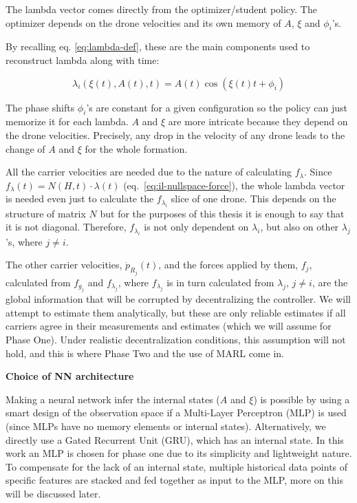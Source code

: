 The lambda vector comes directly from the optimizer/student policy. The
optimizer depends on the drone velocities and its own memory of $A$,
$\xi$ and $\phi_i$'s.

By recalling eq. \eqref{eq:lambda-def}, these are the main components
used to reconstruct lambda along with time:

\begin{equation}
  \lambda_i(\xi(t), A(t), t) = A(t) \cos(\xi(t) t + \phi_i)
  \label{eq:lambda-def-recap}
\end{equation}

The phase shifts $\phi_i$'s are constant for a given configuration so
the policy can just memorize it for each lambda. $A$ and $\xi$ are more
intricate because they depend on the drone velocities. Precisely, any
drop in the velocity of any drone leads to the change of $A$ and $\xi$
for the whole formation.

All the carrier velocities are needed due to the nature of calculating
$f_\lambda$. Since $f_\lambda(t) = N(H,t) \cdot \lambda(t)$
(eq.~\eqref{eq:il-nullspace-force}), the whole lambda vector is needed
even just to calculate the $f_{\lambda_i}$ slice of one drone. This
depends on the structure of matrix $N$ but for the purposes of this
thesis it is enough to say that it is not diagonal. Therefore,
$f_{\lambda_i}$ is not only dependent on $\lambda_i$, but also on
other $\lambda_j$'s, where $j \neq i$.

The other carrier velocities, $\dot{p}_{R_j}(t)$, and the
forces applied by them, $f_j$, calculated from $f_{g_j}$ and
$f_{\lambda_j}$, where $f_{\lambda_j}$ is in turn calculated from
$\lambda_j$, $j \neq i$, are the global information that will be
corrupted by decentralizing the controller. We will attempt to estimate
them analytically, but these are only reliable estimates if all
carriers agree in their measurements and estimates (which we will
assume for Phase One). Under realistic decentralization conditions,
this assumption will not hold, and this is where Phase Two and the use
of MARL come in.

\noindent\textbf{Choice of NN architecture}

Making a neural network infer the internal states (\(A\) and \(\xi\))
is possible by using a smart design of the observation space if a
Multi-Layer Perceptron (MLP) is used (since MLPs have no memory
elements or internal states). Alternatively, we directly use a Gated
Recurrent Unit (GRU), which has an internal state. In this work an MLP
is chosen for phase one due to its simplicity and lightweight nature.
To compensate for the lack of an internal state, multiple historical
data points of specific features are stacked and fed together as input
to the MLP, more on this will be discussed later.

